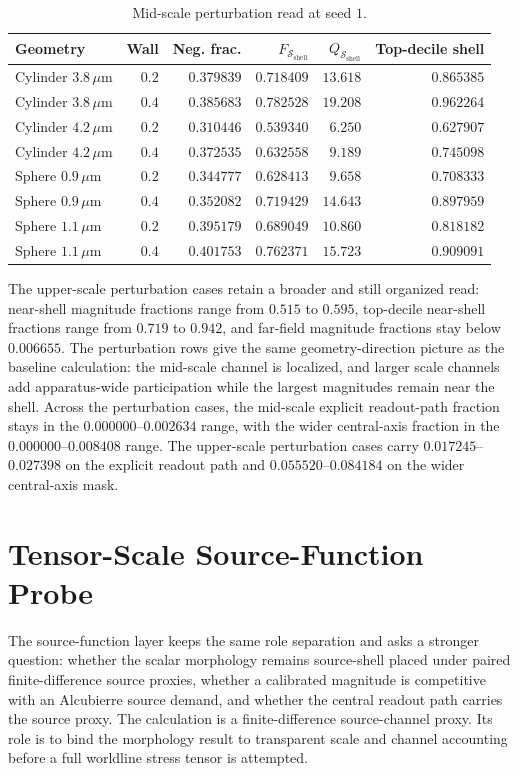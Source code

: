 \documentclass[11pt]{article}
\newcommand{\um}{\,\mu\mathrm{m}}
\newcommand{\shell}{\mathcal{S}_{\mathrm{shell}}}
\begin{document}
\begin{table}[htbp]
\centering
\caption{Mid-scale perturbation read at seed $1$.}
\label{tab:perturb}
\small
\begin{tabular}{lrrrrr}
\toprule
Geometry & Wall & Neg. frac. & $F_{\shell}$ & $Q_{\shell}$ & Top-decile shell \\
\midrule
Cylinder $3.8\um$ & $0.2$ & $0.379839$ & $0.718409$ & $13.618$ & $0.865385$ \\
Cylinder $3.8\um$ & $0.4$ & $0.385683$ & $0.782528$ & $19.208$ & $0.962264$ \\
Cylinder $4.2\um$ & $0.2$ & $0.310446$ & $0.539340$ & $6.250$ & $0.627907$ \\
Cylinder $4.2\um$ & $0.4$ & $0.372535$ & $0.632558$ & $9.189$ & $0.745098$ \\
Sphere $0.9\um$ & $0.2$ & $0.344777$ & $0.628413$ & $9.658$ & $0.708333$ \\
Sphere $0.9\um$ & $0.4$ & $0.352082$ & $0.719429$ & $14.643$ & $0.897959$ \\
Sphere $1.1\um$ & $0.2$ & $0.395179$ & $0.689049$ & $10.860$ & $0.818182$ \\
Sphere $1.1\um$ & $0.4$ & $0.401753$ & $0.762371$ & $15.723$ & $0.909091$ \\
\bottomrule
\end{tabular}
\end{table}

The upper-scale perturbation cases retain a broader and still organized read:
near-shell magnitude fractions range from $0.515$ to $0.595$, top-decile
near-shell fractions range from $0.719$ to $0.942$, and far-field magnitude
fractions stay below $0.006655$. The perturbation rows give the same
geometry-direction picture as the baseline calculation: the mid-scale channel
is localized, and larger scale channels add apparatus-wide participation while
the largest magnitudes remain near the shell. Across the perturbation cases, the mid-scale explicit
readout-path fraction stays in the $0.000000$--$0.002634$ range, with the wider
central-axis fraction in the $0.000000$--$0.008408$ range. The upper-scale
perturbation cases carry $0.017245$--$0.027398$ on the explicit readout path
and $0.055520$--$0.084184$ on the wider central-axis mask.

\section{Tensor-Scale Source-Function Probe}

The source-function layer keeps the same role separation and asks a stronger
question: whether the scalar morphology remains source-shell placed under
paired finite-difference source proxies, whether a calibrated magnitude is
competitive with an Alcubierre source demand, and whether the central readout
path carries the source proxy. The calculation is a finite-difference
source-channel proxy. Its role is to bind the morphology result to transparent
scale and channel accounting before a full worldline stress tensor is attempted.
\end{document}
